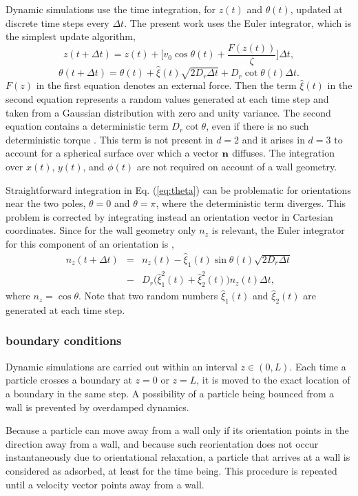 \documentclass[pre,twocolumn,graphicx]{revtex4-1}
\newcommand{\ba}{\begin{eqnarray}}
\newcommand{\ea}{\end{eqnarray}}
\newcommand{\be}{\begin{equation}}
\newcommand{\ee}{\end{equation}}
\begin{document}
Dynamic simulations use the time integration, for $z(t)$ and $\theta(t)$, updated at discrete time steps 
every $\Delta t$.  The present work uses the Euler integrator, which is the simplest update algorithm, 
\be
z(t+\Delta t) = z(t) + \bigg[ v_0 \cos\theta(t) + \frac{F(z(t))}{\zeta}\bigg]  \Delta t, 
\label{eq:z}
\ee
\be
\theta(t+\Delta t) = \theta(t) + \hat\xi(t)\sqrt{2D_r \Delta t} + D_r \cot\theta(t)\Delta t.
\label{eq:theta}
\ee
$F(z)$ in the first equation denotes an external force.  
Then the term $\hat\xi(t)$ in the second equation represents a random values generated at each time step 
and taken from a Gaussian distribution with zero and unity variance.  
The second equation contains a deterministic term $D_r\cot\theta$, even if there is no such 
deterministic torque \cite{Hsu03,Engel04,Gompper15}.  This term is not present in $d=2$ and it arises 
in $d=3$ to account for a spherical surface over which a vector ${\bf n}$ diffuses.  The integration
over $x(t)$, $y(t)$, and $\phi(t)$ are not required on account of a wall geometry.  

Straightforward integration in Eq. (\ref{eq:theta}) can be problematic for orientations near the two 
poles, $\theta=0$ and $\theta=\pi$, where the deterministic term diverges.  This problem is corrected 
by integrating instead an orientation vector in Cartesian coordinates.  Since for the wall geometry 
only $n_z$ is relevant, the Euler integrator for this component of an orientation is \cite{Gompper15}, 
\ba
n_z(t+\Delta t) &=& n_z(t) - \hat\xi_1(t)\sin\theta(t) \sqrt{2D_r\Delta t} \nonumber\\ 
&-& D_r\big(\hat\xi_{1}^2(t) + \hat\xi_{2}^2(t)\big)n_z(t)\Delta t,
\label{eq:nz}
\ea
where $n_z=\cos\theta$.  Note that two random numbers $\hat\xi_1(t)$ and $\hat\xi_2(t)$ are generated at each time step.  



\subsubsection{boundary conditions}
\label{sec:BC}


Dynamic simulations are carried out within an interval $z \in(0,L)$.  Each time a particle crosses a 
boundary at $z=0$ or $z=L$, it is moved to the exact location of a boundary in the same step.  
A possibility of a particle being bounced from a wall is prevented by overdamped dynamics.  


Because a particle can move away from a wall only if its orientation points in the direction away from a wall, 
and because such reorientation does not occur instantaneously due to orientational relaxation, 
a particle that arrives at a wall is considered as adsorbed, at least for the time being. 
This procedure is repeated until a velocity vector points away from a wall. 
\end{document}

